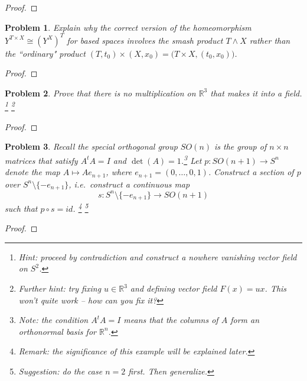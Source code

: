 \documentclass[11pt]{article}
\newtheorem{problem}{Problem}
\begin{document}
\begin{proof}

\end{proof}

\pagebreak 



\begin{problem}
Explain why the correct version of the homeomorphism $Y^{T\times X}\cong (Y^X)^T$ for based spaces involves the smash product $T\wedge X$ rather than the ``ordinary" product $(T,t_0)\times (X,x_0)=\big(T\times X, (t_0,x_0)\big)$. 
\end{problem}

\begin{proof}

\end{proof}

\pagebreak 




\begin{problem}
Prove that there is no multiplication on $\mathbb R^3$ that makes it into a field. \footnote{Hint: proceed by contradiction and construct a nowhere vanishing vector field on $S^2$.} \footnote{Further hint: try fixing $u\in\mathbb R^3$ and defining vector field $F(x)=ux$. This won't quite work -- how can you fix it?}
\end{problem}

\begin{proof}

\end{proof}

\pagebreak 





\begin{problem}
Recall the special orthogonal group $SO(n)$ is the group of $n\times n$ matrices that satisfy $A^tA=I$ and $\det(A)=1$.\footnote{Note: the condition $A^tA=I$ means that the columns of $A$ form an orthonormal basis for $\mathbb R^n$.}  Let $p: SO (n+1)\rightarrow S^n$ denote the map  $A\mapsto Ae_{n+1}$, where $e_{n+1}=(0,\ldots,0,1)$. Construct a section of $p$ over $S^n\setminus\{-e_{n+1}\}$, i.e.\ construct a continuous map 
\[s:S^n\setminus\{-e_{n+1}\}\to SO (n+1)\] such that $p\circ s=id$. \footnote{Remark: the significance of this example will be explained later.} \footnote{Suggestion: do the case $n=2$ first. Then generalize.}
\end{problem}

\begin{proof}

\end{proof}
\end{document}
